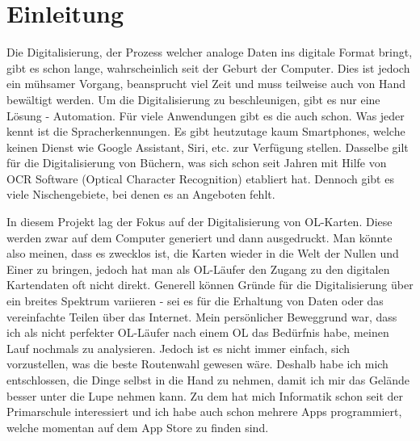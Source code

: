 \section{Einleitung}

Die Digitalisierung, der Prozess welcher analoge Daten ins digitale Format bringt, gibt es schon lange, wahrscheinlich seit der Geburt der Computer. Dies ist jedoch ein mühsamer Vorgang, beansprucht viel Zeit und muss teilweise auch von Hand bewältigt werden. Um die Digitalisierung  zu beschleunigen, gibt es nur eine Lösung - Automation. Für viele Anwendungen gibt es die auch schon. Was jeder kennt ist  die Spracherkennungen. Es gibt heutzutage kaum Smartphones, welche keinen Dienst wie Google Assistant, Siri, etc. zur Verfügung stellen. Dasselbe gilt für die Digitalisierung von Büchern, was sich schon seit Jahren mit Hilfe von OCR Software (Optical Character Recognition) etabliert hat. Dennoch gibt es viele Nischengebiete, bei denen es an Angeboten fehlt.

In diesem Projekt lag der Fokus auf der Digitalisierung von OL-Karten. Diese werden zwar auf dem Computer generiert und dann ausgedruckt. Man könnte also meinen, dass es zwecklos ist, die Karten wieder in die Welt der Nullen und Einer zu bringen, jedoch hat man als OL-Läufer den Zugang zu den digitalen Kartendaten oft nicht direkt. Generell können Gründe für die Digitalisierung über ein breites Spektrum variieren - sei es für die Erhaltung von Daten oder das vereinfachte Teilen über das Internet. Mein persönlicher Beweggrund war, dass ich als nicht perfekter OL-Läufer nach einem OL das Bedürfnis habe, meinen Lauf nochmals zu analysieren. Jedoch ist es nicht immer einfach, sich vorzustellen, was die beste Routenwahl gewesen wäre. Deshalb habe ich mich entschlossen, die Dinge selbst in die Hand zu nehmen, damit ich mir das Gelände besser unter die Lupe nehmen kann. Zu dem hat mich Informatik schon seit der Primarschule interessiert und ich habe auch schon mehrere Apps programmiert, welche momentan auf dem App Store zu finden sind.